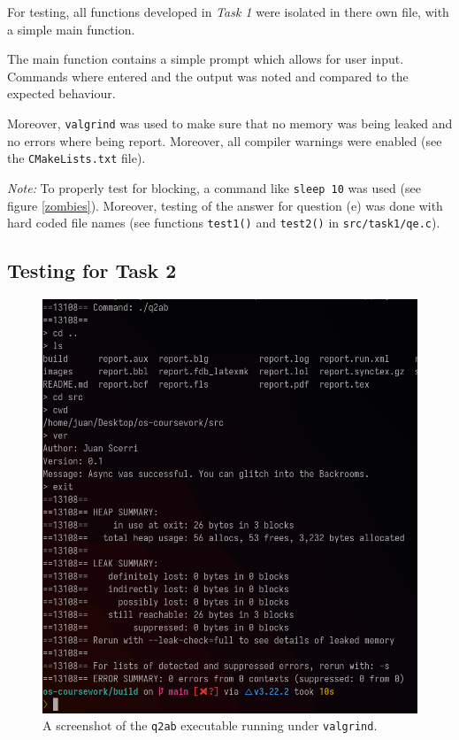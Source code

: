 \documentclass[12pt]{article}
\begin{document}
For testing, all functions developed in \textit{Task 1} were
isolated in there own file, with a simple main function.

The main function contains a simple prompt which allows for
user input. Commands where entered and the output was noted and
compared to the expected behaviour.

Moreover, \texttt{valgrind} was used to make sure that no memory
was being leaked and no errors where being report. Moreover, all
compiler warnings were enabled (see the \texttt{CMakeLists.txt}
file).

\textit{Note:} To properly test for blocking, a command like
\texttt{sleep 10} was used (see figure \ref{zombies}). Moreover,
testing of the answer for question (e) was done with hard coded
file names (see functions \texttt{test1()} and \texttt{test2()}
in \texttt{src/task1/qe.c}).

\subsection{Testing for Task 2}

\begin{figure}[H]
\centering
\includegraphics[width=12cm]{q2ab-test}
\caption{A screenshot of the \texttt{q2ab} executable running
under \texttt{valgrind}.}
\end{figure}
\end{document}
